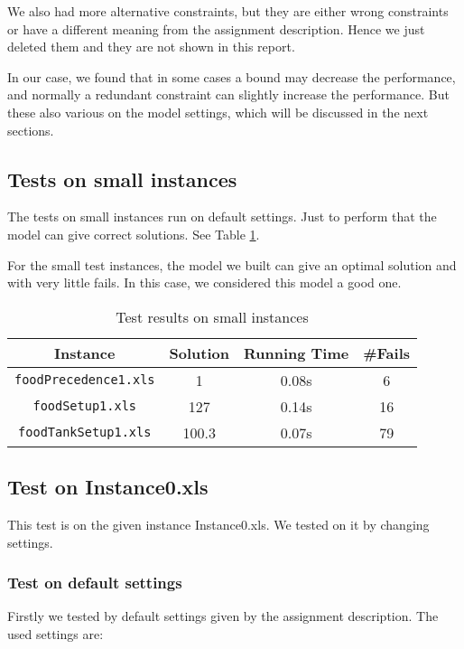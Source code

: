 \documentclass[a4paper, 12pt]{article}
\begin{document}
We also had more alternative constraints, but they are either wrong constraints or have a different meaning from the assignment description. Hence we just deleted them and they are not shown in this report. 

In our case, we found that in some cases a bound may decrease the performance, and normally a redundant constraint can slightly increase the performance. But these also various on the model settings, which will be discussed in the next sections.

\subsection{Tests on small instances}

The tests on small instances run on default settings. Just to perform that the model can give correct solutions. See Table \ref{small}. 

For the small test instances, the model we built can give an optimal solution and with very little fails. In this case, we considered this model a good one. 

\begin{table}
    \centering
    \caption{Test results on small instances}
    \label{small}
    \begin{tabular}{|c|c|c|c|}
    \hline
    Instance & Solution & Running Time & \#Fails \\
    \hline
    \texttt{foodPrecedence1.xls} & 1 & 0.08s & 6 \\
    \hline 
    \texttt{foodSetup1.xls} & 127 & 0.14s & 16 \\
    \hline
    \texttt{foodTankSetup1.xls} & 100.3 & 0.07s & 79 \\
    \hline 
    \end{tabular}
\end{table} 

\subsection{Test on Instance0.xls}

This test is on the given instance Instance0.xls. We tested on it by changing settings. 

\subsubsection{Test on default settings}

Firstly we tested by default settings given by the assignment description. The used settings are: 
\end{document}
